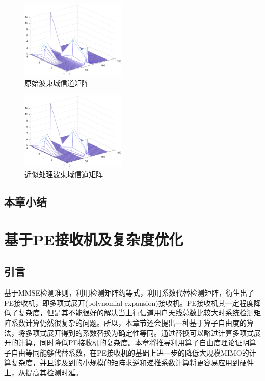 \documentclass[bachelor,nocolorlinks, printoneside]{seuthesis} %
\begin{document}
\begin{Main}
\begin{figure}[htbp!]
\end{figure}
\begin{figure}[htbp!]
	\centering \includegraphics[width=0.45\textwidth]{img/3_2.eps} \caption{原始波束域信道矩阵}
\end{figure}
\begin{figure}[htbp!]
	\centering \includegraphics[width=0.45\textwidth]{img/3_3.eps} \caption{近似处理波束域信道矩阵}
\end{figure}

\section{本章小结}

\chapter{基于PE接收机及复杂度优化}
\section{引言}
基于MMSE检测准则，利用检测矩阵约等式，利用系数代替检测矩阵，衍生出了PE接收机，即多项式展开(polynomial expansion)接收机。PE接收机其一定程度降低了复杂度，但是其不能很好的解决当上行信道用户天线总数比较大时系统检测矩阵系数计算仍然很复杂的问题。所以，本章节还会提出一种基于算子自由度的算法，将多项式展开得到的系数替换为确定性等同。通过替换可以略过计算多项式展开的计算，同时降低PE接收机的复杂度。本章将推导利用算子自由度理论证明算子自由等同能够代替系数，在PE接收机的基础上进一步的降低大规模MIMO的计算复杂度，并且涉及到的小规模的矩阵求逆和递推系数计算将更容易应用到硬件上，从提高其检测时延。

\end{Main}
\end{document}
